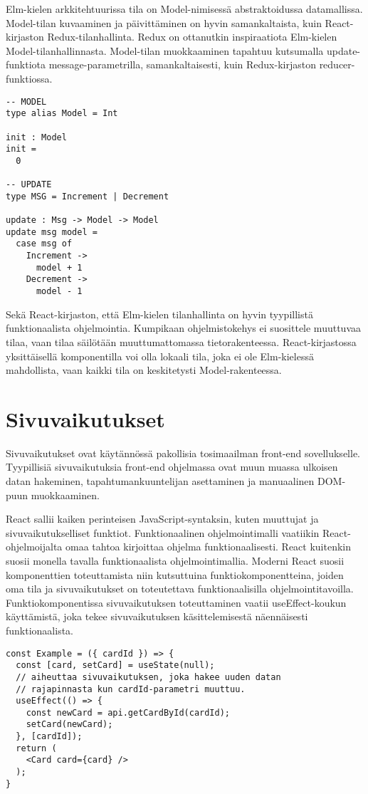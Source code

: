 Elm-kielen arkkitehtuurissa tila on Model-nimisessä abstraktoidussa datamallissa. Model-tilan kuvaaminen ja
päivittäminen on hyvin samankaltaista, kuin React-kirjaston Redux-tilanhallinta. Redux on ottanutkin inspiraatiota
Elm-kielen Model-tilanhallinnasta. Model-tilan muokkaaminen tapahtuu kutsumalla update-funktiota message-parametrilla,
samankaltaisesti, kuin Redux-kirjaston reducer-funktiossa. \cite{elmlang}
\begin{verbatim}
-- MODEL
type alias Model = Int

init : Model
init =
  0

-- UPDATE
type MSG = Increment | Decrement

update : Msg -> Model -> Model
update msg model =
  case msg of
    Increment ->
      model + 1
    Decrement ->
      model - 1
\end{verbatim}

Sekä React-kirjaston, että Elm-kielen tilanhallinta on hyvin tyypillistä funktionaalista ohjelmointia. Kumpikaan
ohjelmistokehys ei suosittele muuttuvaa tilaa, vaan tilaa säilötään muuttumattomassa tietorakenteessa. React-kirjastossa
yksittäisellä komponentilla voi olla lokaali tila, joka ei ole Elm-kielessä mahdollista, vaan kaikki tila on
keskitetysti Model-rakenteessa.

\section{Sivuvaikutukset}
Sivuvaikutukset ovat käytännössä pakollisia tosimaailman front-end sovellukselle. Tyypillisiä sivuvaikutuksia front-end
ohjelmassa ovat muun muassa ulkoisen datan hakeminen, tapahtumankuuntelijan asettaminen ja manuaalinen DOM-puun
muokkaaminen.

React sallii kaiken perinteisen JavaScript-syntaksin, kuten muuttujat ja sivuvaikutukselliset funktiot. Funktionaalinen
ohjelmointimalli vaatiikin React-ohjelmoijalta omaa tahtoa kirjoittaa ohjelma funktionaalisesti. React kuitenkin suosii
monella tavalla funktionaalista ohjelmointimallia. Moderni React suosii komponenttien toteuttamista niin kutsuttuina
funktiokomponentteina, joiden oma tila ja sivuvaikutukset on toteutettava funktionaalisilla ohjelmointitavoilla.
Funktiokomponentissa sivuvaikutuksen toteuttaminen vaatii useEffect-koukun käyttämistä, joka tekee sivuvaikutuksen
käsittelemisestä näennäisesti funktionaalista. \cite{reactjs}
\begin{verbatim}
const Example = ({ cardId }) => {
  const [card, setCard] = useState(null);
  // aiheuttaa sivuvaikutuksen, joka hakee uuden datan
  // rajapinnasta kun cardId-parametri muuttuu.
  useEffect(() => {
    const newCard = api.getCardById(cardId);
    setCard(newCard);
  }, [cardId]);
  return (
    <Card card={card} />
  );
}
\end{verbatim}


